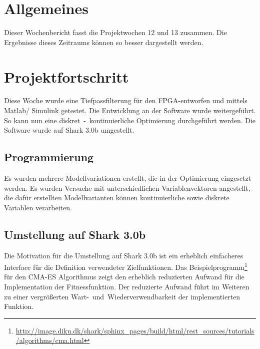 \documentclass[a4paper,12pt,fleqn]{article}
\begin{document}
\setlength{\headheight}{36pt}

\begin{titlepage}



\end{titlepage}

\section[Allgemeines]{Allgemeines}
%
Dieser Wochenbericht fasst die Projektwochen 12 und 13 zusammen. Die Ergebnisse dieses Zeitraums können so besser dargestellt werden.
%
\section[Fortschritt]{Projektfortschritt}
%
Diese Woche wurde eine Tiefpassfilterung für den FPGA-entworfen und mittels Matlab/ Simulink getestet. Die Entwicklung an der Software wurde weitergeführt. So kann nun eine diskret~-~kontinuierliche Optimierung durchgeführt werden. Die Software wurde auf Shark 3.0b umgestellt.
%
\subsection{Programmierung}
%
Es wurden mehrere Modellvariationen erstellt, die in der Optimierung eingesetzt werden. Es wurden Versuche mit unterschiedlichen Variablenvektoren angestellt, die dafür erstellten Modellvarianten können kontinuierliche sowie diskrete Variablen verarbeiten.
%
\subsection{Umstellung auf Shark 3.0b}
%
Die Motivation für die Umstellung auf Shark 3.0b ist ein erheblich einfacheres Interface für die Definition verwendeter Zielfunktionen. Das Beispielprogramm\footnote{\url{http://image.diku.dk/shark/sphinx_pages/build/html/rest_sources/tutorials/algorithms/cma.html}} für den CMA-ES Algorithmus zeigt den erheblich reduzierten Aufwand für die Implementation der Fitnessfunktion. Der reduzierte Aufwand führt im Weiteren zu einer vergrößerten Wart-~und~Wiederverwendbarkeit der implementierten Funktion.
%
\end{document}
